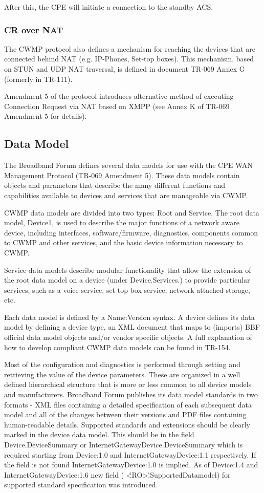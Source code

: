 After this, the CPE will initiate a connection to the standby ACS.

\subsubsection{CR over NAT}
The CWMP protocol also defines a mechanism for reaching the devices that are connected behind NAT (e.g. IP-Phones, Set-top boxes). This mechanism, based on STUN and UDP NAT traversal, is defined in document TR-069 Annex G (formerly in TR-111).

Amendment 5 of the protocol introduces alternative method of executing Connection Request via NAT based on XMPP (see Annex K of TR-069 Amendment 5 for details).


\subsection{Data Model}
The Broadband Forum defines several data models for use with the CPE WAN Management Protocol (TR-069 Amendment 5). These data models contain objects and parameters that describe the many different functions and capabilities available to devices and services that are manageable via CWMP.

CWMP data models are divided into two types: Root and Service. The root data model, Device1, is used to describe the major functions of a network aware device, including interfaces, software/firmware, diagnostics, components common to CWMP and other services, and the basic device information necessary to CWMP.

Service data models describe modular functionality that allow the extension of the root data model on a device (under Device.Services.) to provide particular services, such as a voice service, set top box service, network attached storage, etc.

Each data model is defined by a Name:Version syntax. A device defines its data model by defining a device type, an XML document that maps to (imports) BBF official data model objects and/or vendor specific objects. A full explanation of how to develop compliant CWMP data models can be found in TR-154.

Most of the configuration and diagnostics is performed through setting and retrieving the value of the device parameters. These are organized in a well defined hierarchical structure that is more or less common to all device models and manufacturers. Broadband Forum publishes its data model standards in two formats - XML files containing a detailed specification of each subsequent data model and all of the changes between their versions and PDF files containing human-readable details. Supported standards and extensions should be clearly marked in the device data model. This should be in the field Device.DeviceSummary or InternetGatewayDevice.DeviceSummary which is required starting from Device:1.0 and InternetGatewayDevice:1.1 respectively. If the field is not found InternetGatewayDevice:1.0 is implied. As of Device:1.4 and InternetGatewayDevice:1.6 new field ( \'<RO>\'.SupportedDatamodel) for supported standard specification was introduced.


